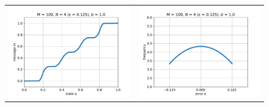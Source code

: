 \documentclass[12pt]{article}
\begin{document}
\begin{figure}[h]
\begin{center}
\begin{tabular}{cc}
			\includegraphics[scale=.5]{msg2} & \includegraphics[scale=.5]{err2} \\

\end{tabular}
\end{center}
\end{figure}
\end{document}
